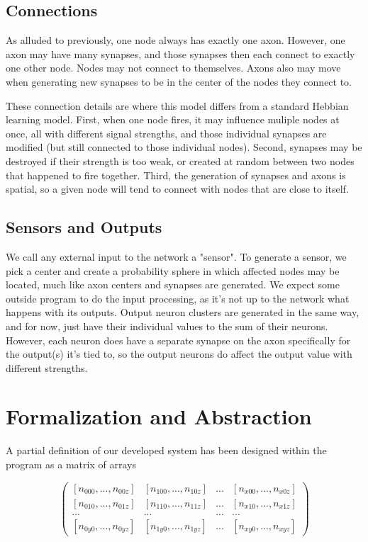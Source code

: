 \documentclass[12pt]{article}
\begin{document}
\subsection{Connections}

As alluded to previously, one node always has exactly one axon.  However, one axon may have many synapses, and those synapses then each connect to exactly one other node.  Nodes may not connect to themselves.  Axons also may move when generating new synapses to be in the center of the nodes they connect to.

These connection details are where this model differs from a standard Hebbian learning model.  First, when one node fires, it may influence muliple nodes at once, all with different signal strengths, and those individual synapses are modified (but still connected to those individual nodes).  Second, synapses may be destroyed if their strength is too weak, or created at random between two nodes that happened to fire together.  Third, the generation of synapses and axons is spatial, so a given node will tend to connect with nodes that are close to itself.

\subsection{Sensors and Outputs}

We call any external input to the network a "sensor".  To generate a sensor, we pick a center and create a probability sphere in which affected nodes may be located, much like axon centers and synapses are generated.  We expect some outside program to do the input processing, as it's not up to the network what happens with its outputs.  Output neuron clusters are generated in the same way, and for now, just have their individual values to the sum of their neurons.  However, each neuron does have a separate synapse on the axon specifically for the output(s) it's tied to, so the output neurons do affect the output value with different strengths.

\newpage

\section{Formalization and Abstraction}

A partial definition of our developed system has been designed within the program as a matrix of arrays

$$
\left(\begin{array}{cccc}
{[n_{000}, ..., n_{00z}]} & {[n_{100}, ..., n_{10z}]} & ... & {[n_{x00}, ..., n_{x0z}]} \\
{[n_{010}, ..., n_{01z}]} & {[n_{110}, ..., n_{11z}]} & ... & {[n_{x10}, ..., n_{x1z}]} \\
... & ... &... & ... \\
{[n_{0y0}, ..., n_{0yz}]} & {[n_{1y0}, ..., n_{1yz}]} & ... & {[n_{xy0}, ..., n_{xyz}]}
\end{array} \right)
$$
\end{document}
